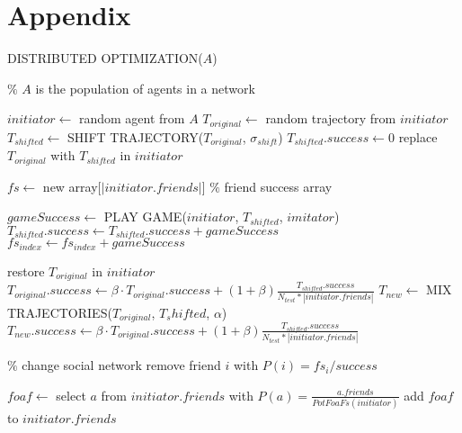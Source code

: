 \appendix
\section{Appendix}
\begin{algorithm}[b]
    \caption{DISTRIBUTED OPTIMIZATION($A$)}
    \label{algo:1}
    \begin{algorithmic}[2]
        \State $\%$ $A$ is the population of agents  in a network
        
            \State $initiator \leftarrow $ random agent from $A$
            \State $T_{original} \leftarrow $ random trajectory from $initiator$
            \State $T_{shifted} \leftarrow $ SHIFT TRAJECTORY($T_{original}$, $\sigma_{shift}$)
            \State $T_{shifted}.success \leftarrow 0$
            \State replace $T_{original}$ with $T_{shifted}$ in $initiator$

            \State $fs \leftarrow$ new array[$|initiator.friends|$] $\%$ friend success array 

                    \State $gameSuccess \leftarrow$ PLAY GAME($initiator$, $T_{shifted}$, $imitator$)
                    \State $T_{shifted}.success \leftarrow T_{shifted}.success + gameSuccess$
                   \State $fs_{index} \leftarrow fs_{index} +  gameSuccess$
                \EndLoop
            \EndFor

                \State restore $T_{original}$ in $initiator$
                \State $T_{original}.success \leftarrow \beta \cdot T_{original}.success + (1+\beta)\frac{T_{shifted}.success}{N_{test} * |initiator.friends|}$
            \Else
                \State $T_{new} \leftarrow$ MIX TRAJECTORIES($T_{original}$, $T_shifted$, $\alpha$)
                \State $T_{new}.success \leftarrow \beta \cdot T_{original}.success + (1+\beta)\frac{T_{shifted}.success}{N_{test} * |initiator.friends|}$
            \EndIf

            \State $\%$ change social network
                \State remove friend $i$ with $P(i) = fs_i/success$
            \EndIf

            \State $foaf \leftarrow$ select $a$ from $initiator.friends$ with $P(a) = \frac{a.friends}{PotFoaFs(initiator)}$ 
            \State add $foaf$ to $initiator.friends$
        \EndLoop 
    \end{algorithmic}
\end{algorithm}

